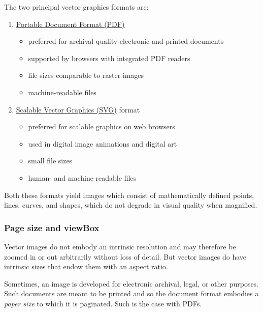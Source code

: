 \documentclass[
  11pt,
  british,
  a4paper,
]{article}
\providecommand{\tightlist}{%
  \setlength{\itemsep}{0pt}\setlength{\parskip}{0pt}}
\begin{document}
The two principal vector graphics formats are:

\begin{enumerate}
\tightlist
\item
  \href{https://en.wikipedia.org/wiki/PDF}{Portable Document Format
  (PDF)}

  \begin{itemize}
  \tightlist
  \item
    preferred for archival quality electronic and printed documents
  \item
    supported by browsers with integrated PDF readers
  \item
    file sizes comparable to raster images
  \item
    machine-readable files
  \end{itemize}
\item
  \href{https://en.wikipedia.org/wiki/Scalable_Vector_Graphics}{Scalable
  Vector Graphics (SVG)} format

  \begin{itemize}
  \tightlist
  \item
    preferred for scalable graphics on web browsers
  \item
    used in digital image animations and digital art
  \item
    small file sizes
  \item
    human- and machine-readable files
  \end{itemize}
\end{enumerate}

Both these formats yield images which consist of mathematically defined
points, lines, curves, and shapes, which do not degrade in visual
quality when magnified.

\hypertarget{page-size-and-viewbox}{%
\subsubsection{Page size and viewBox}\label{page-size-and-viewbox}}

Vector images do not embody an intrinsic resolution and may therefore be
zoomed in or out arbitrarily without loss of detail. But vector images
do have intrinsic sizes that endow them with an
\href{https://en.wikipedia.org/wiki/Aspect_ratio}{aspect ratio}.

Sometimes, an image is developed for electronic archival, legal, or
other purposes. Such documents are meant to be printed and so the
document format embodies a \emph{paper size} to which it is paginated.
Such is the case with PDFs.
\end{document}
